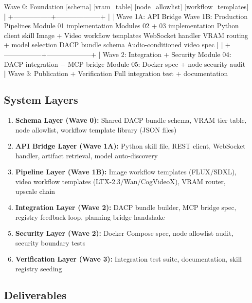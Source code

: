 \documentclass[11pt,letterpaper]{article}
\begin{document}
\begin{asciibox}
Wave 0: Foundation
  [schema] [vram_table] [node_allowlist] [workflow_templates]
                    |
  +-----------------+--------------------+
  |                                      |
Wave 1A: API Bridge          Wave 1B: Production Pipelines
  Module 01 implementation      Modules 02 + 03 implementation
  Python client skill           Image + Video workflow templates
  WebSocket handler             VRAM routing + model selection
  DACP bundle schema            Audio-conditioned video spec
  |                                      |
  +-----------------+--------------------+
                    |
Wave 2: Integration + Security
  Module 04: DACP integration + MCP bridge
  Module 05: Docker spec + node security audit
                    |
Wave 3: Publication + Verification
  Full integration test + documentation
\end{asciibox}

\subsection{System Layers}

\begin{enumerate}
  \item \textbf{Schema Layer (Wave 0):} Shared DACP bundle schema, VRAM tier table, node allowlist,
  workflow template library (JSON files)
  \item \textbf{API Bridge Layer (Wave 1A):} Python skill file, REST client, WebSocket handler,
  artifact retrieval, model auto-discovery
  \item \textbf{Pipeline Layer (Wave 1B):} Image workflow templates (FLUX/SDXL), video workflow
  templates (LTX-2.3/Wan/CogVideoX), VRAM router, upscale chain
  \item \textbf{Integration Layer (Wave 2):} DACP bundle builder, MCP bridge spec, registry
  feedback loop, planning-bridge handshake
  \item \textbf{Security Layer (Wave 2):} Docker Compose spec, node allowlist audit, security
  boundary tests
  \item \textbf{Verification Layer (Wave 3):} Integration test suite, documentation, skill
  registry seeding
\end{enumerate}

\subsection{Deliverables}
\end{document}
